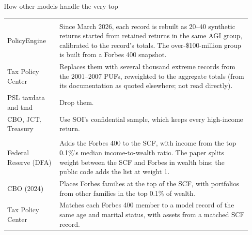 \begin{frame}{How other models handle the very top}
  \scriptsize
  \renewcommand{\arraystretch}{1.25}
  \begin{tabular}{>{\raggedright}p{3.0cm} >{\raggedright\arraybackslash}p{10.1cm}}
    \toprule
    \multicolumn{2}{l}{\textbf{The aggregate records}} \\
    PolicyEngine & Since March 2026, each record is rebuilt as 20--40 synthetic returns started from
                   retained returns in the same AGI group, calibrated to the record's totals. The
                   over-\$100-million group is built from a Forbes 400 snapshot. \\
    Tax Policy Center & Replaces them with several thousand extreme records from the 2001--2007 PUFs,
                        reweighted to the aggregate totals (from its documentation as quoted elsewhere;
                        not read directly). \\
    PSL taxdata and tmd & Drop them. \\
    CBO, JCT, Treasury & Use SOI's confidential sample, which keeps every high-income return. \\
    \midrule
    \multicolumn{2}{l}{\textbf{Rich lists}} \\
    Federal Reserve (DFA) & Adds the Forbes 400 to the SCF, with income from the top 0.1\%'s median
                            income-to-wealth ratio. The paper splits weight between the SCF and Forbes in
                            wealth bins; the public code adds the list at weight 1. \\
    CBO (2024) & Places Forbes families at the top of the SCF, with portfolios from other families in the
                 top 0.1\% of wealth. \\
    Tax Policy Center & Matches each Forbes 400 member to a model record of the same age and marital status,
                        with assets from a matched SCF record. \\
    \bottomrule
  \end{tabular}
\end{frame}

